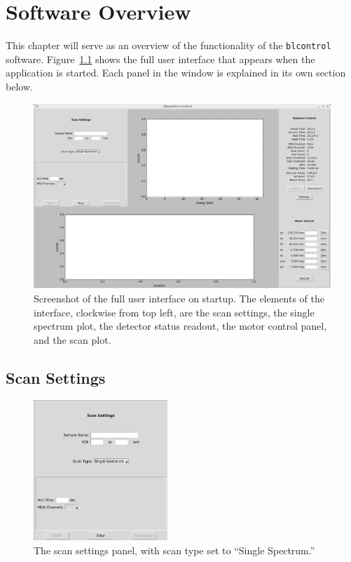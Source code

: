 \chapter{Software Overview\label{sec:software}}

This chapter will serve as an overview of the functionality of the \texttt{blcontrol} software. Figure~\ref{fig:ui} shows the full user interface that appears when the application is started. Each panel in the window is explained in its own section below.


\begin{figure}
\centering
\includegraphics[width=\textwidth]{fullui.png}
\caption{\label{fig:ui} Screenshot of the full user interface on startup. The elements of the interface, clockwise from top left, are the scan settings, the single spectrum plot, the detector status readout, the motor control panel, and the scan plot.}
\end{figure}

\section{Scan Settings}

\begin{figure}
\centering
\includegraphics[width=0.45\textwidth]{scansettings.png}
\caption{\label{fig:scanset} The scan settings panel, with scan type set to ``Single Spectrum.''}
\end{figure}

